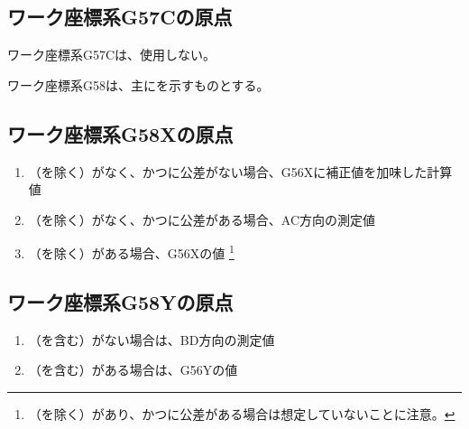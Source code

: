 \subsection{ワーク座標系{\ttfamily G57C}の原点}
ワーク座標系{\ttfamily G57C}は、使用しない。



ワーク座標系{\ttfamily G58}は、主に\KeywayCenter を示すものとする。


\subsection{ワーク座標系{\ttfamily G58X}の原点}
\begin{enumerate}[label*=\sarrow]
\item \TopOutcut（\TopCurvedOutcut を除く）がなく、かつ\AsideKeywayDepth に公差がない場合、{\ttfamily G56X}に補正値を加味した計算値
\item \TopOutcut（\TopCurvedOutcut を除く）がなく、かつ\AsideKeywayDepth に公差がある場合、AC方向\KeywayCenter の測定値
\item \TopOutcut（\TopCurvedOutcut を除く）がある場合、{\ttfamily G56X}の値
\footnote{\TopOutcut（\TopCurvedOutcut を除く）があり、かつ\AsideKeywayDepth に公差がある場合は想定していないことに注意。}
\end{enumerate}


\subsection{ワーク座標系{\ttfamily G58Y}の原点}
\begin{enumerate}[label*=\sarrow]
\item \TopOutcut（\TopCurvedOutcut を含む）がない場合は、BD方向\KeywayCenter の測定値
\item \TopOutcut（\TopCurvedOutcut を含む）がある場合は、{\ttfamily G56Y}の値
\end{enumerate}


